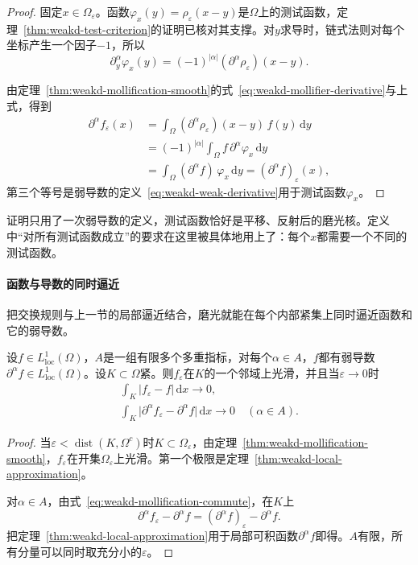 \begin{proof}
固定$x\in\Omega_\varepsilon$。函数$\varphi_x(y)=\rho_\varepsilon(x-y)$是$\Omega$上的测试函数，定理~\ref{thm:weakd-test-criterion}的证明已核对其支撑。对$y$求导时，链式法则对每个坐标产生一个因子$-1$，所以
\[
\partial_y^\alpha\varphi_x(y)=(-1)^{\lvert\alpha\rvert}(\partial^\alpha\rho_\varepsilon)(x-y).
\]

由定理~\ref{thm:weakd-mollification-smooth}的式~\eqref{eq:weakd-mollifier-derivative}与上式，得到
\[
\begin{aligned}
\partial^\alpha f_\varepsilon(x)&=\int_\Omega(\partial^\alpha\rho_\varepsilon)(x-y)\,f(y)\,\mathrm dy\\
&=(-1)^{\lvert\alpha\rvert}\int_\Omega f\,\partial^\alpha\varphi_x\,\mathrm dy\\
&=\int_\Omega(\partial^\alpha f)\,\varphi_x\,\mathrm dy=(\partial^\alpha f)_\varepsilon(x),
\end{aligned}
\]
第三个等号是弱导数的定义~\eqref{eq:weakd-weak-derivative}用于测试函数$\varphi_x$。
\end{proof}

证明只用了一次弱导数的定义，测试函数恰好是平移、反射后的磨光核。定义中“对所有测试函数成立”的要求在这里被具体地用上了：每个$x$都需要一个不同的测试函数。

\paragraph{函数与导数的同时逼近}
把交换规则与上一节的局部逼近结合，磨光就能在每个内部紧集上同时逼近函数和它的弱导数。

\begin{theorem}[磨光的同时局部逼近]
\label{thm:weakd-simultaneous-approximation}
设$f\in L^1_{\mathrm{loc}}(\Omega)$，$A$是一组有限多个多重指标，对每个$\alpha\in A$，$f$都有弱导数$\partial^\alpha f\in L^1_{\mathrm{loc}}(\Omega)$。设$K\subset\Omega$紧。则$f_\varepsilon$在$K$的一个邻域上光滑，并且当$\varepsilon\to0$时
\begin{equation}
\begin{gathered}
\int_K\lvert f_\varepsilon-f\rvert\,\mathrm dx\to0,\\
\int_K\lvert\partial^\alpha f_\varepsilon-\partial^\alpha f\rvert\,\mathrm dx\to0\quad(\alpha\in A).
\end{gathered}
\label{eq:weakd-simultaneous-approximation}
\end{equation}
\end{theorem}

\begin{proof}
当$\varepsilon<\operatorname{dist}(K,\Omega^{c})$时$K\subset\Omega_\varepsilon$，由定理~\ref{thm:weakd-mollification-smooth}，$f_\varepsilon$在开集$\Omega_\varepsilon$上光滑。第一个极限是定理~\ref{thm:weakd-local-approximation}。

对$\alpha\in A$，由式~\eqref{eq:weakd-mollification-commute}，在$K$上
\[
\partial^\alpha f_\varepsilon-\partial^\alpha f=(\partial^\alpha f)_\varepsilon-\partial^\alpha f .
\]
把定理~\ref{thm:weakd-local-approximation}用于局部可积函数$\partial^\alpha f$即得。$A$有限，所有分量可以同时取充分小的$\varepsilon$。
\end{proof}

